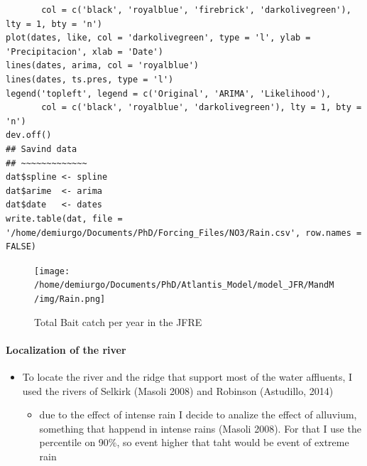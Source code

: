 \documentclass[11pt]{article}
\begin{document}
\begin{itemize}
\begin{itemize}
\begin{verbatim}
       col = c('black', 'royalblue', 'firebrick', 'darkolivegreen'), lty = 1, bty = 'n')
plot(dates, like, col = 'darkolivegreen', type = 'l', ylab = 'Precipitacion', xlab = 'Date')
lines(dates, arima, col = 'royalblue')
lines(dates, ts.pres, type = 'l')
legend('topleft', legend = c('Original', 'ARIMA', 'Likelihood'),
       col = c('black', 'royalblue', 'darkolivegreen'), lty = 1, bty = 'n')
dev.off()
## Savind data
## ~~~~~~~~~~~~~
dat$spline <- spline
dat$arime  <- arima
dat$date   <- dates
write.table(dat, file = '/home/demiurgo/Documents/PhD/Forcing_Files/NO3/Rain.csv', row.names = FALSE)
\end{verbatim}
\end{itemize}
\begin{figure}[htb]
  \centering
  \texttt{[image: /home/demiurgo/Documents/PhD/Atlantis\_Model/model\_JFR/MandM/img/Rain.png]}
  \caption{Total Bait catch per year in the JFRE}
  \end{figure}
\end{itemize}
\paragraph*{Localization of the river}
\label{sec-5-3-1-2}

\begin{itemize}
\item To locate the river and the ridge that support most of the water affluents,  I used the rivers of Selkirk (Masoli 2008) and Robinson (Astudillo,  2014)
\begin{itemize}
\item due to the effect of intense rain I decide to analize the effect of alluvium,  something that happend in intense rains (Masoli 2008). For that I use the percentile on 90\%,  so event higher that taht would be event of extreme rain
\end{itemize}
\end{itemize}
\end{document}
